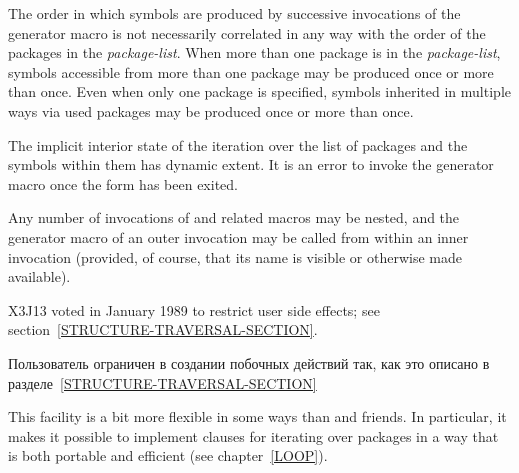 \begin{defmac}
The order in which symbols are produced by successive invocations
of the generator macro is not necessarily correlated in any way
with the order of the packages in the \emph{package-list}.
When more than one package is in the \emph{package-list},
symbols accessible from more than one package may be produced
once or more than once.  Even when only one package is specified,
symbols inherited in multiple ways via used packages may be
produced once or more than once.

The implicit interior state of the iteration over the list of packages
and the symbols within them has dynamic extent.
It is an error to invoke the generator macro
once the  form has been exited.

Any number of invocations of 
and related macros may be nested, and the generator macro of an
outer invocation may be called from within an inner invocation
(provided, of course, that its name is visible or otherwise made available).

X3J13 voted in January 1989
to restrict user side effects; see section~\ref{STRUCTURE-TRAVERSAL-SECTION}.

Пользователь ограничен в создании побочных действий так, как это описано в
разделе~\ref{STRUCTURE-TRAVERSAL-SECTION}

\beforenoterule
\begin{rationale}
This facility is a bit more flexible in some ways than 
and friends.
In particular, it makes it possible to implement 
clauses for iterating over packages in a way that is both portable
and efficient (see chapter~\ref{LOOP}).
\end{rationale}
\afternoterule
\end{defmac}
\fi